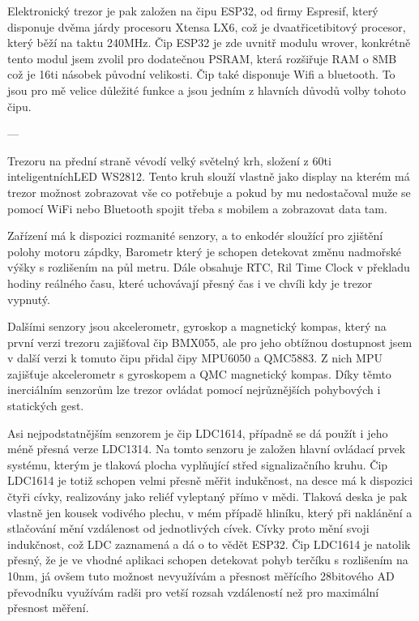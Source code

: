     Elektronický trezor je pak založen na čipu ESP32, od firmy Espresif, který disponuje 
    dvěma járdy procesoru Xtensa LX6, 
    což je dvaatřicetibitový procesor, který běží na taktu 240MHz. 
    Čip ESP32 je zde uvnitř modulu wrover, konkrétně tento modul jsem zvolil pro dodatečnou 
    PSRAM, která rozšiřuje RAM o 8MB
    což je 16ti násobek původní velikosti.
    Čip také disponuje Wifi a bluetooth. To jsou pro mě velice důležité funkce a jsou 
    jedním z hlavních důvodů volby tohoto čipu.

    ---

    Trezoru na přední straně vévodí velký světelný krh, složení z 60ti inteligentníchLED 
    WS2812. Tento kruh slouží vlastně jako display na kterém má trezor možnost zobrazovat 
    vše co potřebuje a pokud by mu nedostačoval muže se pomocí WiFi nebo Bluetooth spojit 
    třeba s mobilem a zobrazovat data tam.

    Zařízení má k dispozici rozmanité senzory, a to
        enkodér sloužící pro zjištění polohy motoru zápdky,
        Barometr který je schopen detekovat změnu nadmořské výšky
        s rozlišením na půl metru. %
        Dále obsahuje RTC, Ril Time Clock v překladu hodiny reálného času, 
        které uchovávají přesný čas i ve chvíli kdy je trezor vypnutý.
        
        Dalšími senzory jsou akcelerometr, gyroskop a magnetický kompas, který na první verzi 
        trezoru zajišťoval čip BMX055, ale pro jeho obtížnou dostupnost jsem v další verzi 
        k tomuto čipu přidal čipy MPU6050 a QMC5883. Z nich 
        MPU zajišťuje akcelerometr s gyroskopem a QMC magnetický kompas.
        Díky těmto inerciálním senzorům lze trezor ovládat pomocí nejrůznějších pohybových 
        i statických gest.
        
        Asi nejpodstatnějším senzorem je čip LDC1614, případně se dá použít i jeho méně přesná verze LDC1314.
        Na tomto senzoru je založen hlavní ovládací prvek systému, kterým je tlaková plocha vyplňující střed 
        signalizačního kruhu. Čip LDC1614 je totiž schopen velmi přesně měřit indukčnost, na desce má 
        k dispozici čtyři cívky, realizovány jako reliéf vyleptaný přímo v mědi. Tlaková deska je pak 
        vlastně jen kousek vodivého plechu, v mém případě hliníku, který při naklánění a stlačování mění 
        vzdálenost od jednotlivých cívek. Cívky proto mění svoji indukčnost, 
        což LDC zaznamená a dá o to vědět ESP32. Čip LDC1614 je natolik přesný, že je ve vhodné aplikaci 
        schopen detekovat pohyb terčíku s rozlišením na 10nm, já ovšem tuto možnost nevyužívám a přesnost 
        měřícího 28bitového 
        AD převodníku využívám radši pro vetší rozsah vzdáleností než pro maximální přesnost měření.

